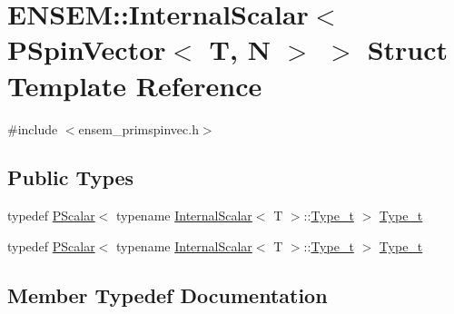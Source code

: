 \hypertarget{structENSEM_1_1InternalScalar_3_01PSpinVector_3_01T_00_01N_01_4_01_4}{}\section{E\+N\+S\+EM\+:\+:Internal\+Scalar$<$ P\+Spin\+Vector$<$ T, N $>$ $>$ Struct Template Reference}
\label{structENSEM_1_1InternalScalar_3_01PSpinVector_3_01T_00_01N_01_4_01_4}


{\ttfamily \#include $<$ensem\+\_\+primspinvec.\+h$>$}

\subsection*{Public Types}
\begin{DoxyCompactItemize}
\item 
typedef \mbox{\hyperlink{classENSEM_1_1PScalar}{P\+Scalar}}$<$ typename \mbox{\hyperlink{structENSEM_1_1InternalScalar}{Internal\+Scalar}}$<$ T $>$\+::\mbox{\hyperlink{structENSEM_1_1InternalScalar_3_01PSpinVector_3_01T_00_01N_01_4_01_4_a65d7d95d2a184abe920b5589a148ce04}{Type\+\_\+t}} $>$ \mbox{\hyperlink{structENSEM_1_1InternalScalar_3_01PSpinVector_3_01T_00_01N_01_4_01_4_a65d7d95d2a184abe920b5589a148ce04}{Type\+\_\+t}}
\item 
typedef \mbox{\hyperlink{classENSEM_1_1PScalar}{P\+Scalar}}$<$ typename \mbox{\hyperlink{structENSEM_1_1InternalScalar}{Internal\+Scalar}}$<$ T $>$\+::\mbox{\hyperlink{structENSEM_1_1InternalScalar_3_01PSpinVector_3_01T_00_01N_01_4_01_4_a65d7d95d2a184abe920b5589a148ce04}{Type\+\_\+t}} $>$ \mbox{\hyperlink{structENSEM_1_1InternalScalar_3_01PSpinVector_3_01T_00_01N_01_4_01_4_a65d7d95d2a184abe920b5589a148ce04}{Type\+\_\+t}}
\end{DoxyCompactItemize}


\subsection{Member Typedef Documentation}
\mbox{\label{structENSEM_1_1InternalScalar_3_01PSpinVector_3_01T_00_01N_01_4_01_4_a65d7d95d2a184abe920b5589a148ce04}} 
